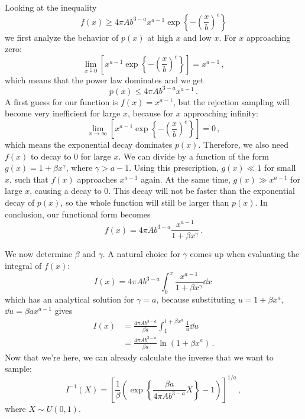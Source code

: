 Looking at the inequality
\begin{equation}
    f(x) \geq 4\pi A b^{3-a} x^{a-1} \exp\left\{-\left(\frac{x}{b}\right)^{c} \right\}
\end{equation}
we first analyze the behavior of $p(x)$ at high $x$ and low $x$. For $x$ approaching zero:
\begin{equation}
    \lim_{x \downarrow 0} \left[ x^{a-1} \exp\left\{-\left(\frac{x}{b}\right)^{c} \right\} \right] = x^{a-1} \, ,
\end{equation}
which means that the power law dominates and we get
\begin{equation}
    p(x) \leq 4\pi A b^{3-a} x^{a-1} \, .
\end{equation}
A first guess for our function is $f(x) = x^{a-1}$, but the rejection sampling will become very inefficient for large $x$, because for $x$ approaching infinity:
\begin{equation}
    \lim_{x \to \infty} \left[ x^{a-1} \exp\left\{-\left(\frac{x}{b}\right)^{c} \right\} \right] = 0 \, ,
\end{equation}
which means the exponential decay dominates $p(x)$. Therefore, we also need $f(x)$ to decay to 0 for large $x$. We can divide by a function of the form $g(x) = 1+\beta x^\gamma$, where $\gamma > a-1$. Using this prescription, $g(x) \ll 1$ for small $x$, such that $f(x)$ approaches $x^{a-1}$ again. At the same time, $g(x) \gg x^{a-1}$ for large $x$, causing a decay to 0. This decay will not be faster than the exponential decay of $p(x)$, so the whole function will still be larger than $p(x)$. In conclusion, our functional form becomes
\begin{equation}
    f(x) = 4\pi A b^{3-a} \frac{x^{a-1}}{1+\beta x^\gamma} \, .
\end{equation}

We now determine $\beta$ and $\gamma$. A natural choice for $\gamma$ comes up when evaluating the integral of $f(x)$:
\begin{equation}
    I(x) = 4\pi A b^{3-a} \int_{0}^{x} \frac{x^{a-1}}{1+\beta x^\gamma} \dd x \,
\end{equation}
which has an analytical solution for $\gamma = a$, because substituting $u = 1 + \beta x^a$, $\dd u = \beta a x^{a-1}$ gives 
\begin{align}
    I(x) 
    &= \frac{4\pi A b^{3-a}}{\beta a} \int_{1}^{1+\beta x^a} \frac{1}{u} \dd u \\
    &= \frac{4\pi A b^{3-a}}{\beta a} \ln \left( 1 + \beta x^a \right) \, .
\end{align}
Now that we're here, we can already calculate the inverse that we want to sample:
\begin{equation}
    I^{-1}(X) = \left[ \frac{1}{\beta} \left( \exp\left\{ \frac{\beta a}{4\pi A b^{3-a}} X \right\} - 1 \right) \right]^{1/a} \, ,
\end{equation}
where $X \sim U(0,1)$.

